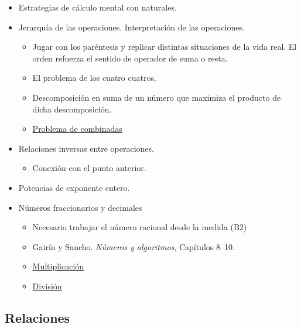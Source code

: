 \begin{itemize}
  \item Estrategias de cálculo mental con naturales.
  \item Jerarquía de las operaciones. Interpretación de las operaciones.
  \begin{itemize}
    \item Jugar con los paréntesis y replicar distintas situaciones de la vida real. El orden refuerza el sentido de operador de suma o resta.
    \item El problema de los cuatro cuatros.
    \item Descomposición en suma de un número que maximiza el producto de dicha descomposición.
    \item \href{/problema_combinadas_1eso.jpg}{Problema de combinadas}
  \end{itemize}
  \item Relaciones inversas entre operaciones.
  \begin{itemize}
    \item Conexión con el punto anterior.
  \end{itemize}
  \item Potencias de exponente entero.
  \item Números fraccionarios y decimales
  \begin{itemize}
    \item Necesario trabajar el número racional desde la medida (B2)
    \item Gairín y Sancho. \emph{Números y algoritmos}, Capítulos 8--10.
    \item \href{https://tierradenumeros.com/post/hilo-multiplicacion-de-fracciones-unpacked/}{Multiplicación}
    \item \href{https://tierradenumeros.com/post/hilo-division-fracciones-unpacked/}{División}
  \end{itemize}
\end{itemize}

\subsection*{Relaciones}

